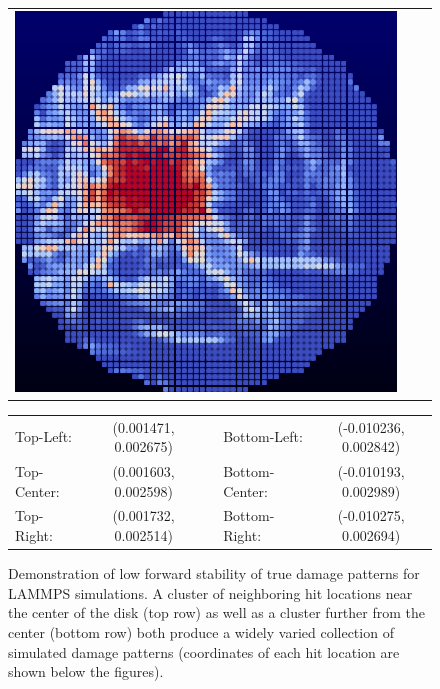 \begin{figure}
\begin{tabular}{ccc}
  \includegraphics[scale=0.75]{true_soln_19051.eps} 
  \end{tabular}
  \begin{tabular}{lcclc}
  Top-Left:   &  (0.001471, 0.002675) & & Bottom-Left:   & (-0.010236, 0.002842) \\
  Top-Center: &  (0.001603, 0.002598) & & Bottom-Center: & (-0.010193, 0.002989) \\
  Top-Right:  &  (0.001732, 0.002514) & & Bottom-Right:  & (-0.010275, 0.002694) \\
  \end{tabular}
\caption{Demonstration of low forward stability of true damage patterns for LAMMPS simulations.  A cluster of neighboring hit locations near the center of the disk (top row) as well as a cluster further from the center (bottom row) both produce a widely varied collection of simulated damage patterns (coordinates of each hit location are shown below the figures).}
\label{fig:forward_solutions}       
\end{figure}


